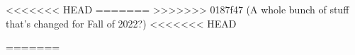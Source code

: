 \documentclass{../../oss-apphys-exam}
\begin{document}
\begin{questions}
%
  
<<<<<<< HEAD
=======
>>>>>>> 0187f47 (A whole bunch of stuff that's changed for Fall of 2022?)
<<<<<<< HEAD
  
=======


\end{questions}
\end{document}
